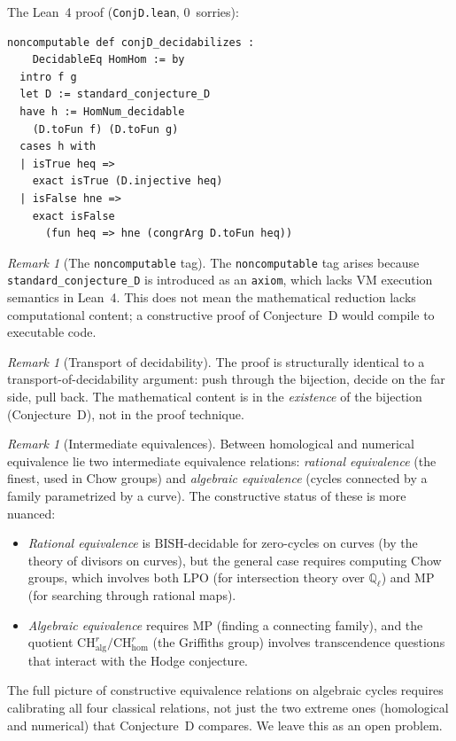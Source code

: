 \documentclass[11pt]{article}
\theoremstyle{definition}
\theoremstyle{remark}
\newtheorem{remark}[theorem]{Remark}
\newcommand{\Q}{\mathbb{Q}}
\newcommand{\Qell}{\Q_\ell}
\newcommand{\LPO}{\mathrm{LPO}}
\newcommand{\MP}{\mathrm{MP}}
\newcommand{\BISH}{\mathrm{BISH}}
\begin{document}
The Lean~4 proof (\texttt{ConjD.lean}, 0~sorries):

\begin{lstlisting}
noncomputable def conjD_decidabilizes :
    DecidableEq HomHom := by
  intro f g
  let D := standard_conjecture_D
  have h := HomNum_decidable
    (D.toFun f) (D.toFun g)
  cases h with
  | isTrue heq =>
    exact isTrue (D.injective heq)
  | isFalse hne =>
    exact isFalse
      (fun heq => hne (congrArg D.toFun heq))
\end{lstlisting}

\begin{remark}[The \texttt{noncomputable} tag]
The \texttt{noncomputable} tag arises because \texttt{standard\_conjecture\_D} is introduced as an \texttt{axiom}, which lacks VM execution semantics in Lean~4. This does not mean the mathematical reduction lacks computational content; a constructive proof of Conjecture~D would compile to executable code.
\end{remark}

\begin{remark}[Transport of decidability]
The proof is structurally identical to a transport-of-decidability argument: push through the bijection, decide on the far side, pull back. The mathematical content is in the \emph{existence} of the bijection (Conjecture~D), not in the proof technique.
\end{remark}

\begin{remark}[Intermediate equivalences]
Between homological and numerical equivalence lie two intermediate equivalence relations: \emph{rational equivalence} (the finest, used in Chow groups) and \emph{algebraic equivalence} (cycles connected by a family parametrized by a curve). The constructive status of these is more nuanced:
\begin{itemize}
\item \emph{Rational equivalence} is $\BISH$-decidable for zero-cycles on curves (by the theory of divisors on curves), but the general case requires computing Chow groups, which involves both $\LPO$ (for intersection theory over $\Qell$) and $\MP$ (for searching through rational maps).
\item \emph{Algebraic equivalence} requires $\MP$ (finding a connecting family), and the quotient $\mathrm{CH}^r_{\mathrm{alg}} / \mathrm{CH}^r_{\mathrm{hom}}$ (the Griffiths group) involves transcendence questions that interact with the Hodge conjecture.
\end{itemize}
The full picture of constructive equivalence relations on algebraic cycles requires calibrating all four classical relations, not just the two extreme ones (homological and numerical) that Conjecture~D compares. We leave this as an open problem.
\end{remark}
\end{document}

